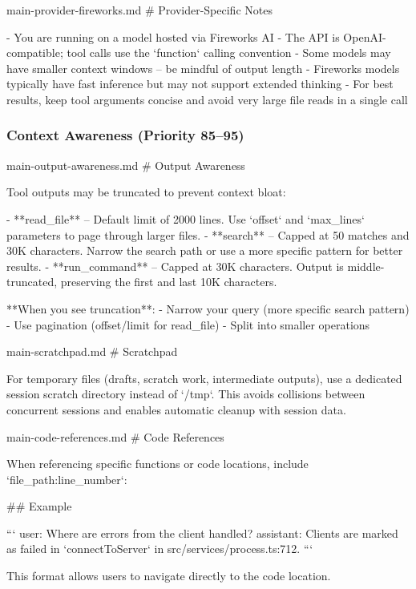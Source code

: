 \begin{prompttemplate}{main-provider-fireworks.md}
# Provider-Specific Notes

- You are running on a model hosted via Fireworks AI
- The API is OpenAI-compatible; tool calls use the `function` calling
  convention
- Some models may have smaller context windows -- be mindful of output
  length
- Fireworks models typically have fast inference but may not support
  extended thinking
- For best results, keep tool arguments concise and avoid very large file
  reads in a single call
\end{prompttemplate}

\subsubsection{Context Awareness (Priority 85--95)}
\label{app:tpl_context}

\begin{prompttemplate}{main-output-awareness.md}
# Output Awareness

Tool outputs may be truncated to prevent context bloat:

- **read_file** -- Default limit of 2000 lines. Use `offset` and
  `max_lines` parameters to page through larger files.
- **search** -- Capped at 50 matches and 30K characters. Narrow the
  search path or use a more specific pattern for better results.
- **run_command** -- Capped at 30K characters. Output is middle-truncated,
  preserving the first and last 10K characters.

**When you see truncation**:
- Narrow your query (more specific search pattern)
- Use pagination (offset/limit for read_file)
- Split into smaller operations
\end{prompttemplate}

\begin{prompttemplate}{main-scratchpad.md}
# Scratchpad

For temporary files (drafts, scratch work, intermediate outputs), use
a dedicated session scratch directory instead of `/tmp`. This avoids
collisions between concurrent sessions and enables automatic cleanup with
session data.
\end{prompttemplate}

\begin{prompttemplate}{main-code-references.md}
# Code References

When referencing specific functions or code locations, include
`file_path:line_number`:

## Example

```
user: Where are errors from the client handled?
assistant: Clients are marked as failed in `connectToServer` in
  src/services/process.ts:712.
```

This format allows users to navigate directly to the code location.
\end{prompttemplate}


